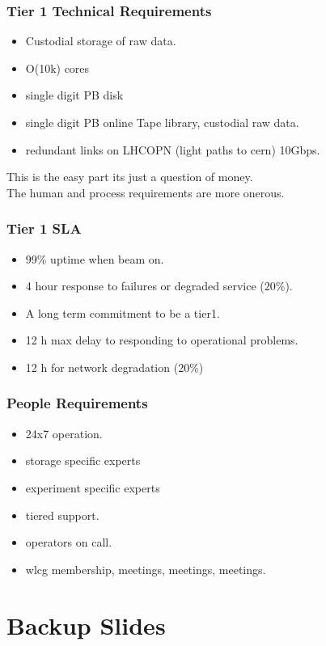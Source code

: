 \documentclass{beamer}
\begin{document}
\begin{frame}
\frametitle{Tier 1 Technical Requirements} 
\begin{itemize}
  \item Custodial storage of raw data.
  \item O(10k) cores
  \item single digit PB disk
  \item single digit PB online Tape library, custodial raw data.
  \item redundant links on LHCOPN (light paths to cern) 10Gbps.
\end{itemize}
This is the easy part its just a question of money.\\
The human and process requirements are more onerous.
\end{frame}

\begin{frame}
  \frametitle{Tier 1 SLA}
  \begin{itemize}
    \item 99\% uptime when beam on.
    \item 4 hour response to failures or degraded service (20\%).
    \item A long term commitment to be a tier1. 
    \item 12 h max delay to responding to operational problems.
    \item 12 h for network degradation (20\%)
  \end{itemize}
\end{frame}

\begin{frame}
\frametitle{People Requirements} 
\begin{itemize}
  \item 24x7 operation.
  \item storage specific experts
  \item experiment specific experts
  \item tiered support.
  \item operators on call.
  \item wlcg membership, meetings, meetings, meetings.
\end{itemize}
\end{frame}

\section{Backup Slides}
\end{document}
